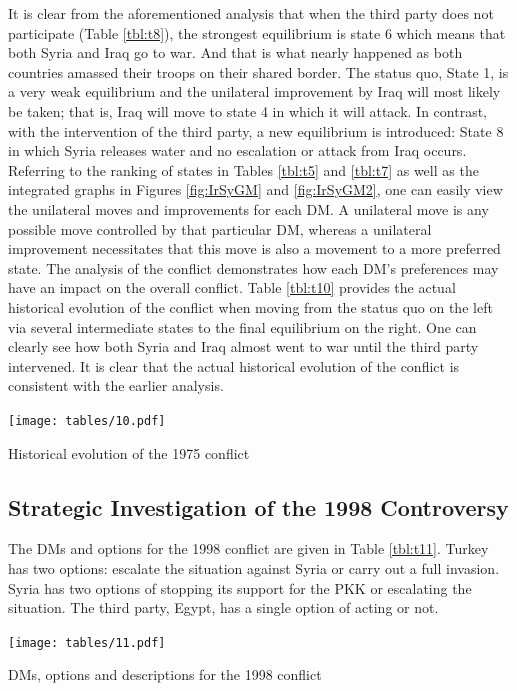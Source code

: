 \documentclass[letterpaper,12pt,titlepage,oneside,final]{book}
\begin{document}
It is clear from the aforementioned analysis that when the third party does not participate (Table  \ref{tbl:t8}), the strongest equilibrium is state 6 which means that both Syria and Iraq go to war. And that is what nearly happened as both countries amassed their troops on their shared border. The status quo, State 1, is a very weak equilibrium and the unilateral improvement by Iraq will most likely be taken; that is, Iraq will move to state 4 in which it will attack. In contrast, with the intervention of the third party, a new equilibrium is introduced: State 8 in which Syria releases water and no escalation or attack from Iraq occurs. Referring to the ranking of states in Tables  \ref{tbl:t5} and  \ref{tbl:t7} as well as the integrated graphs in Figures \ref{fig:IrSyGM} and \ref{fig:IrSyGM2}, one can easily view the unilateral moves and improvements for each DM. A unilateral move is any possible move controlled by that particular DM, whereas a unilateral improvement necessitates that this move is also a movement to a more preferred state.  
The analysis of the conflict demonstrates how each DM's preferences may have an impact on the overall conflict. Table \ref{tbl:t10} provides the actual historical evolution of the conflict when moving from the status quo on the left via several intermediate states to the final equilibrium on the right. One can clearly see how both Syria and Iraq almost went to war until the third party intervened. It is clear that the actual historical evolution of the conflict is consistent with the earlier analysis.


\begin{table}[H]
\centering
\texttt{[image: tables/10.pdf]}

\caption{Historical evolution of the 1975 conflict}

\label{tbl:t10}
\end{table}

\subsection{Strategic Investigation of the 1998 Controversy}
The DMs and options for the 1998 conflict are given in Table \ref{tbl:t11}. Turkey has two options: escalate the situation against Syria or carry out a full invasion. Syria has two options of stopping its support for the PKK or escalating the situation. The third party, Egypt, has a single option of acting or not.

\begin{table}[H]
\centering
\texttt{[image: tables/11.pdf]}

\caption{DMs, options and descriptions for the 1998 conflict}

\label{tbl:t11}
\end{table}
\end{document}
